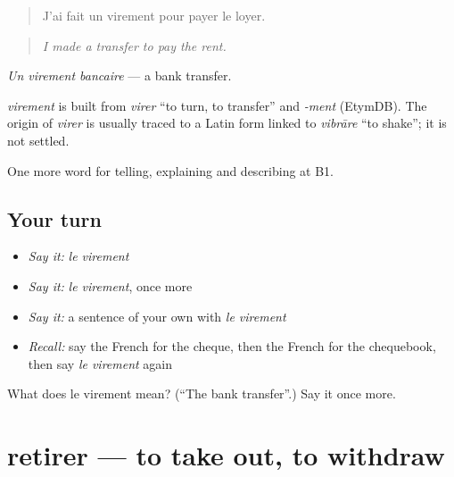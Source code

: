 \begin{quote}
J'ai fait un virement pour payer le loyer.
\end{quote}

\begin{quote}
\emph{I made a transfer to pay the rent.}
\end{quote}

\emph{Un virement bancaire} — a bank transfer.

\begin{cousinweb}
\emph{virement} is built from \emph{virer} \textquotedblleft{}to turn, to transfer\textquotedblright{} and \emph{-ment} (EtymDB). The origin of \emph{virer} is usually traced to a Latin form linked to \emph{vibrāre} \textquotedblleft{}to shake\textquotedblright{}; it is not settled.
\end{cousinweb}

\begin{grammarlens}[title={What you've built}]
One more word for telling, explaining and describing at B1.
\end{grammarlens}

\subsection*{Your turn}
\begin{itemize}
\raggedright
  \item \emph{Say it:} \emph{le virement}
  \item \emph{Say it:} \emph{le virement}, once more
  \item \emph{Say it:} a sentence of your own with \emph{le virement}
  \item \emph{Recall:} say the French for the cheque, then the French for the chequebook, then say \emph{le virement} again
\end{itemize}

\begin{tcolorbox}[breakable,colback=teal!4,colframe=teal!35!black,title={Before you move on}]
What does le virement mean? (\textquotedblleft{}The bank transfer\textquotedblright{}.) Say it once more.
\end{tcolorbox}
\section[retirer]{retirer — to take out, to withdraw}

\label{lesson:FR-C392-retirer}



